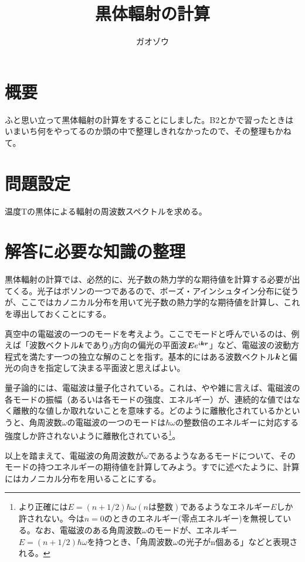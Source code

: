 \documentclass[uplatex,dvipdfmx]{jsarticle}
\title{黒体輻射の計算}
\author{ガオゾウ}
\begin{document}
\maketitle
\section{概要}
ふと思い立って黒体輻射の計算をすることにしました。B2とかで習ったときはいまいち何をやってるのか頭の中で整理しきれなかったので、その整理もかねて。

\section{問題設定}
温度Tの黒体による輻射の周波数スペクトルを求める。

\section{解答に必要な知識の整理}
黒体輻射の計算では、必然的に、光子数の熱力学的な期待値を計算する必要が出てくる。光子はボソンの一つであるので、ボーズ・アインシュタイン分布に従うが、ここではカノニカル分布を用いて光子数の熱力学的な期待値を計算し、これを導出しておくことにする。

\vspace{0.5cm}

真空中の電磁波の一つのモードを考えよう。ここでモードと呼んでいるのは、例えば「波数ベクトル$\vb*{k}$であり$y$方向の偏光の平面波$\vb*{E}e^{i\vb*{kr}}$」など、電磁波の波動方程式を満たす一つの独立な解のことを指す。基本的にはある波数ベクトル$\vb*{k}$と偏光の向きを指定して決まる平面波と思えばよい。

量子論的には、電磁波は量子化されている。これは、やや雑に言えば、電磁波の各モードの振幅（あるいは各モードの強度、エネルギー）が、連続的な値ではなく離散的な値しか取れないことを意味する。どのように離散化されているかというと、角周波数$\omega$の電磁波の一つのモードは$\hbar \omega$の整数倍のエネルギーに対応する強度しか許されないように離散化されている\footnote{より正確には$E=(n+1/2)\hbar\omega(nは整数)$であるようなエネルギー$E$しか許されない。今は$n=0$のときのエネルギー(零点エネルギー)を無視している。なお、電磁波のある角周波数$\omega$のモードが、エネルギー$E=(n+1/2)\hbar\omega$を持つとき、「角周波数$\omega$の光子がn個ある」などと表現される。}。

以上を踏まえて、電磁波の角周波数が$\omega$であるようなあるモードについて、そのモードの持つエネルギーの期待値を計算してみよう。すでに述べたように、計算にはカノニカル分布を用いることにする。
\end{document}
